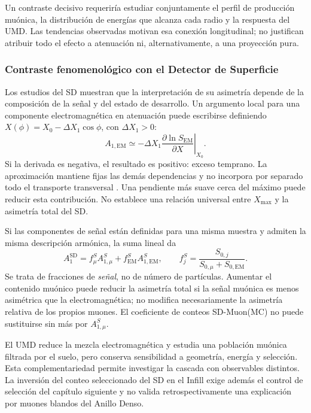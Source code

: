 Un contraste decisivo requeriría estudiar conjuntamente el perfil de producción muónica, la distribución de energías que alcanza cada radio y la respuesta del UMD. Las tendencias observadas motivan esa conexión longitudinal; no justifican atribuir todo el efecto a atenuación ni, alternativamente, a una proyección pura.

\subsubsection{Contraste fenomenológico con el Detector de Superficie}
\label{subsec:contraste_sd_bradfield}

Los estudios del SD \cite{BradfieldThesis} muestran que la interpretación de su asimetría depende de la composición de la señal y del estado de desarrollo. Un argumento local para una componente electromagnética en atenuación puede escribirse definiendo $X(\phi)=X_0-\Delta X_1\cos\phi$, con $\Delta X_1>0$:
\begin{equation}
A_{1,\mathrm{EM}}\simeq-\Delta X_1
\left.\frac{\partial\ln S_{\mathrm{EM}}}{\partial X}\right|_{X_0}.
\label{eq:asym_em_taylor}
\end{equation}
Si la derivada es negativa, el resultado es positivo: exceso temprano. La aproximación mantiene fijas las demás dependencias y no incorpora por separado todo el transporte transversal \cite{dova2003}. Una pendiente más suave cerca del máximo puede reducir esta contribución. No establece una relación universal entre $X_{\mathrm{max}}$ y la asimetría total del SD.

Si las componentes de señal están definidas para una misma muestra y admiten la misma descripción armónica, la suma lineal da
\begin{equation}
A_1^{\mathrm{SD}}=
f_\mu^S A_{1,\mu}^S+f_{\mathrm{EM}}^S A_{1,\mathrm{EM}}^S,
\qquad
f_j^S=\frac{S_{0,j}}{S_{0,\mu}+S_{0,\mathrm{EM}}}.
\end{equation}
Se trata de fracciones de \emph{señal}, no de número de partículas. Aumentar el contenido muónico puede reducir la asimetría total si la señal muónica es menos asimétrica que la electromagnética; no modifica necesariamente la asimetría relativa de los propios muones. El coeficiente de conteos SD-Muon(MC) no puede sustituirse sin más por $A_{1,\mu}^S$.

El UMD reduce la mezcla electromagnética y estudia una población muónica filtrada por el suelo, pero conserva sensibilidad a geometría, energía y selección. Esta complementariedad permite investigar la cascada con observables distintos. La inversión del conteo seleccionado del SD en el Infill exige además el control de selección del capítulo siguiente y no valida retrospectivamente una explicación por muones blandos del Anillo Denso.

\newpage
